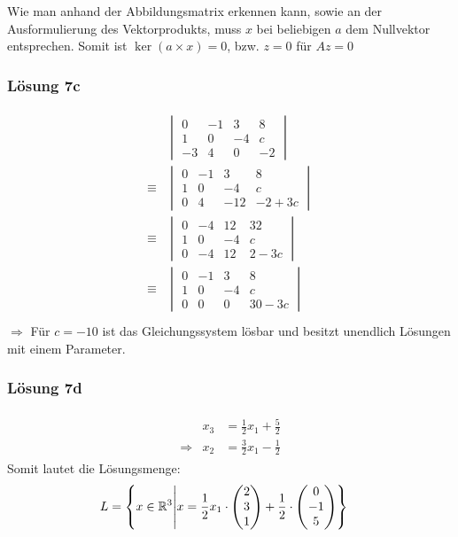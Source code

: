 \documentclass[main.tex]{subfiles}
\begin{document}
Wie man anhand der Abbildungsmatrix erkennen kann, sowie an der Ausformulierung des Vektorprodukts, muss $x$ bei beliebigen $a$ dem Nullvektor entsprechen. Somit ist $\ker(a\times x)=0$, bzw. $z = 0$ für $Az=0$

\subsubsection{Lösung 7c}
\begin{align*}
		\begin{array}{rl}
			&\begin{vmatrix}
				0 & -1 & 3 & 8\\
				1 & 0 & -4 & c\\
				-3 & 4 & 0 & -2
			\end{vmatrix}\\[7mm]
			\equiv & \begin{vmatrix}
				0 & -1 & 3 & 8\\
				1 & 0 & -4 & c\\
				0 & 4 & -12 & -2+3c
			\end{vmatrix}\\[7mm]
			\equiv & \begin{vmatrix}
				0 & -4 & 12 & 32\\
				1 & 0 & -4 & c\\
				0 & -4 & 12 & 2-3c
			\end{vmatrix}\\[7mm]
			\equiv & \begin{vmatrix}
				0 & -1 & 3 & 8\\
				1 & 0 & -4 & c\\
				0 & 0 & 0 & 30-3c
			\end{vmatrix}\\[7mm]
		\end{array}
	\end{align*}
	$\Rightarrow$ Für $c=-10$ ist das Gleichungssystem lösbar und besitzt unendlich Lösungen mit einem Parameter.

\subsubsection{Lösung 7d}
  \begin{align*}
		\begin{array}{rrl}
			& x_3 & = \frac{1}{2}x_1+\frac{5}{2}\\
			\Rightarrow & x_2 & = \frac{3}{2}x_1 - \frac{1}{2}
		\end{array}
	\end{align*}
	Somit lautet die Lösungsmenge:
\begin{align*}
	L &=\left\{x \in \mathbb{R}^3 \middle| x = \frac{1}{2} x_1\cdot
	\begin{pmatrix}
		2\\
		3\\
		1
	\end{pmatrix} + \frac{1}{2} \cdot
	\begin{pmatrix}
		0\\
		-1\\
		5
	\end{pmatrix}\right\}
\end{align*}
\end{document}
